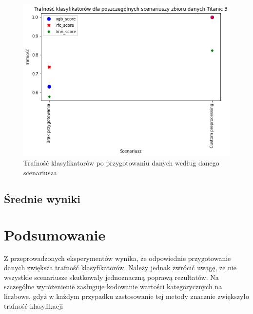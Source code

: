 \documentclass{book}
\begin{document}
\begin{figure}[H]
\centerline{\includegraphics{Titanic_3_Custom}}
\centering
\caption{Trafność klasyfikatorów po przygotowaniu danych 
według danego scenariusza}
\end{figure}


\section{Średnie wyniki}


\chapter{Podsumowanie}
Z przeprowadzonych eksperymentów wynika, 
że odpowiednie przygotowanie danych zwiększa trafność 
klasyfikatorów. Należy jednak zwrócić uwagę, że nie wszystkie 
scenariusze skutkowały jednoznaczną poprawą rezultatów. 
Na szczególne wyróżenienie zasługuje kodowanie wartości 
kategorycznych na liczbowe, gdyż w każdym przypadku zastosowanie 
tej metody znacznie zwiększyło trafność klasyfikacji
\end{document}
